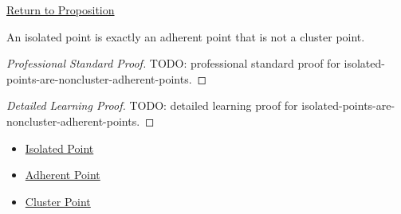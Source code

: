 \newpage
{}
\label{prf:isolated-points-are-noncluster-adherent-points}

\begin{remark*}[Return]
\hyperref[prop:isolated-points-are-noncluster-adherent-points]{Return to Proposition}
\end{remark*}

\begin{proposition*}
An isolated point is exactly an adherent point that is not a cluster point.
\end{proposition*}

\begin{proof}[Professional Standard Proof]
\LRAProofBodyStart
TODO: professional standard proof for isolated-points-are-noncluster-adherent-points.
\end{proof}

\begin{proof}[Detailed Learning Proof]
\LRAProofBodyStart
TODO: detailed learning proof for isolated-points-are-noncluster-adherent-points.
\end{proof}

\begin{remark*}
\end{remark*}

\begin{dependencies}
\begin{itemize}
  \item \hyperref[def:isolated-point-r]{Isolated Point}
  \item \hyperref[def:adherent-point-r]{Adherent Point}
  \item \hyperref[def:cluster-point-r]{Cluster Point}
\end{itemize}
\end{dependencies}

\clearpage
